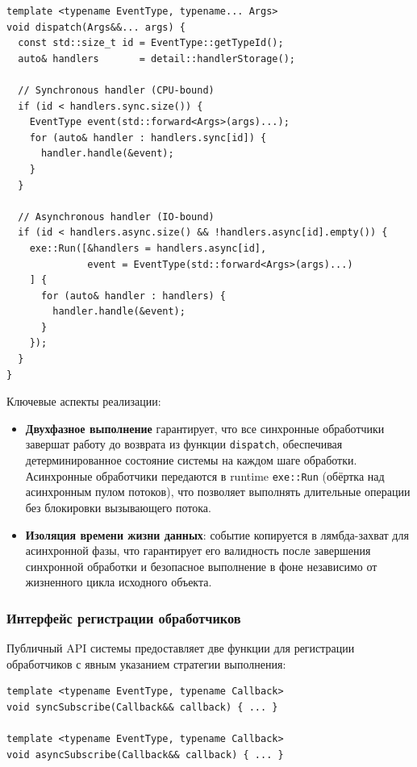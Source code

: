 \begin{lstlisting}[caption={Функция диспетчеризации с разделением стратегий выполнения},label=lst:dispatch_impl]
template <typename EventType, typename... Args>
void dispatch(Args&&... args) {
  const std::size_t id = EventType::getTypeId();
  auto& handlers       = detail::handlerStorage();

  // Synchronous handler (CPU-bound)
  if (id < handlers.sync.size()) {
    EventType event(std::forward<Args>(args)...);
    for (auto& handler : handlers.sync[id]) {
      handler.handle(&event);
    }
  }

  // Asynchronous handler (IO-bound)
  if (id < handlers.async.size() && !handlers.async[id].empty()) {
    exe::Run([&handlers = handlers.async[id],
              event = EventType(std::forward<Args>(args)...)
    ] {
      for (auto& handler : handlers) {
        handler.handle(&event);
      }
    });
  }
}
\end{lstlisting}

Ключевые аспекты реализации:
\begin{itemize}
    \item \textbf{Двухфазное выполнение} гарантирует, что все синхронные обработчики завершат работу до возврата из функции \texttt{dispatch}, обеспечивая детерминированное состояние системы на каждом шаге обработки. Асинхронные обработчики передаются в runtime \texttt{exe::Run} (обёртка над асинхронным пулом потоков), что позволяет выполнять длительные операции без блокировки вызывающего потока.

    \item \textbf{Изоляция времени жизни данных}: событие копируется в лямбда-захват для асинхронной фазы, что гарантирует его валидность после завершения синхронной обработки и безопасное выполнение в фоне независимо от жизненного цикла исходного объекта.
\end{itemize}

\subsubsection{Интерфейс регистрации обработчиков}

Публичный API системы предоставляет две функции для регистрации обработчиков с явным указанием стратегии выполнения:

\begin{lstlisting}[caption={Функции регистрации обработчиков},label=lst:subscribe_impl]
template <typename EventType, typename Callback>
void syncSubscribe(Callback&& callback) { ... }

template <typename EventType, typename Callback>
void asyncSubscribe(Callback&& callback) { ... }
\end{lstlisting}

